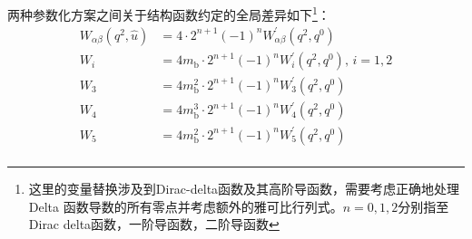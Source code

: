     两种参数化方案之间关于结构函数约定的全局差异如下\footnote{这里的变量替换涉及到Dirac-delta函数及其高阶导函数，需要考虑正确地处理 Delta 函数导数的所有零点并考虑额外的雅可比行列式。$n= 0, 1, 2$分别指至Dirac delta函数，一阶导函数，二阶导函数}：
    \begin{equation}
        \begin{aligned}
                W_{\alpha \beta}(q^{2}, \hat{u}) &= 4 \cdot 2^{n+1} (-1)^{n} W^{\prime}_{\alpha \beta}(q^{2}, q^{0}) \\
                W_{i} &= 4 m_{\mathrm{b}} \cdot 2^{n+1} (-1)^{n} W_{i}^{\prime}(q^{2}, q^{0}), \, i = 1, 2 \\
                W_{3} &= 4 m_{\mathrm{b}}^{2} \cdot 2^{n+1} (-1)^{n} W_{3}^{\prime}(q^{2}, q^{0}) \\
                W_{4} &= 4 m_{\mathrm{b}}^{3} \cdot 2^{n+1} (-1)^{n} W_{4}^{\prime}(q^{2}, q^{0}) \\
                W_{5} &= 4 m_{\mathrm{b}}^{2} \cdot 2^{n+1} (-1)^{n} W_{5}^{\prime}(q^{2}, q^{0}) \\
        \end{aligned}
    \end{equation}    
    
